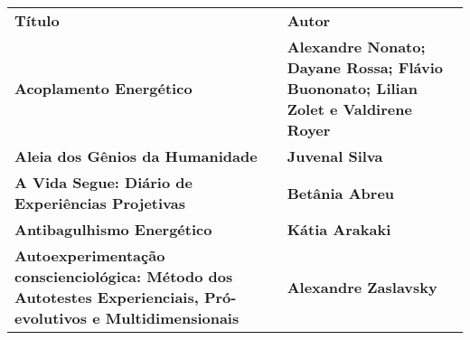 \documentclass[
]{article}
\begin{document}
\begin{longtable}[]{@{}
  >{\raggedright\arraybackslash}p{}
  >{\raggedright\arraybackslash}p{}@{}}
\toprule\noalign{}
\begin{minipage}[b]{\linewidth}\centering
\textbf{Título}
\end{minipage} & \begin{minipage}[b]{\linewidth}\centering
\textbf{Autor}
\end{minipage} \\
\begin{minipage}[b]{\linewidth}\raggedright
\textbf{Acoplamento Energético}
\end{minipage} & \begin{minipage}[b]{\linewidth}\raggedright
\textbf{Alexandre Nonato; Dayane Rossa; Flávio Buononato; Lilian Zolet e Valdirene Royer}
\end{minipage} \\
\begin{minipage}[b]{\linewidth}\raggedright
\textbf{Aleia dos Gênios da Humanidade}
\end{minipage} & \begin{minipage}[b]{\linewidth}\raggedright
\textbf{Juvenal Silva}
\end{minipage} \\
\begin{minipage}[b]{\linewidth}\raggedright
\textbf{A Vida Segue: Diário de Experiências Projetivas}
\end{minipage} & \begin{minipage}[b]{\linewidth}\raggedright
\textbf{Betânia Abreu}
\end{minipage} \\
\begin{minipage}[b]{\linewidth}\raggedright
\textbf{Antibagulhismo Energético}
\end{minipage} & \begin{minipage}[b]{\linewidth}\raggedright
\textbf{Kátia Arakaki}
\end{minipage} \\
\begin{minipage}[b]{\linewidth}\raggedright
\textbf{Autoexperimentação conscienciológica: Método dos Autotestes Experienciais, Pró-evolutivos e Multidimensionais}
\end{minipage} & \begin{minipage}[b]{\linewidth}\raggedright
\textbf{Alexandre Zaslavsky}
\end{minipage} \\

\end{longtable}
\end{document}
